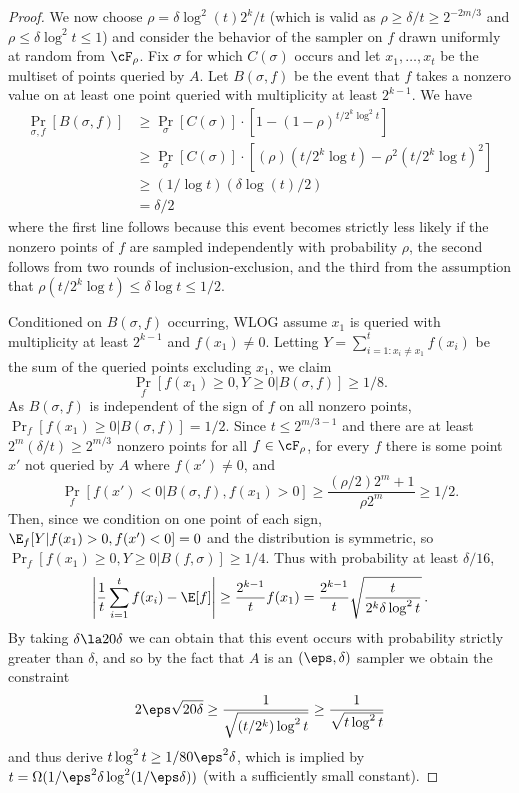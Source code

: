 \documentclass[11pt]{article}
\begin{document}
\begin{proof}
We now choose $\rho=\delta\log^2(t)2^k/t$ (which is valid as $\rho\geq \delta/t\geq 2^{-2m/3}$ and $\rho\leq \delta\log^2 t\leq 1$) and consider the behavior of the sampler on $f$ drawn uniformly at random from $\cF_\rho$. Fix $\sigma$ for which $C(\sigma)$ occurs and let $x_1,\ldots,x_t$ be the multiset of points queried by $A$. Let $B(\sigma,f)$ be the event that $f$ takes a nonzero value on at least one point queried with multiplicity at least $2^{k-1}$. We have
\begin{align*}
    \Pr_{\sigma,f}[B(\sigma,f)] &\geq \Pr_\sigma[C(\sigma)]\cdot \left[1-(1-\rho)^{t/2^k\log^2 t}\right]\\
    &\geq \Pr_\sigma[C(\sigma)]\cdot\left[(\rho)(t/2^k\log t)-\rho^2(t/2^k\log t)^2\right]\\
    &\geq (1/\log t)(\delta \log(t)/2)\\
    &= \delta/2%
\end{align*}
%
where %
the first line follows because this event becomes strictly less likely if the nonzero points of $f$ are sampled independently with probability $\rho$, the second follows from two rounds of inclusion-exclusion, and the third from the assumption that $\rho(t/2^k\log t)\leq \delta\log t\leq 1/2$. 

Conditioned on $B(\sigma,f)$ occurring, WLOG assume $x_1$ is queried with multiplicity at least $2^{k-1}$ and $f(x_1)\neq 0$. 
Letting $Y=\sum_{i=1:x_i\neq x_1}^tf(x_i)$ be the sum of the queried points excluding $x_1$, we claim
\[\Pr_{f}[f(x_1)\geq 0,Y\geq 0|B(\sigma,f)]\geq 1/8.\]
As $B(\sigma,f)$ is independent of the sign of $f$ on all nonzero points, $\Pr_f[f(x_1)\geq 0|B(\sigma,f)]=1/2$. Since $t \leq 2^{m/3-1}$ and there are at least $2^m(\delta/t)\geq 2^{m/3}$ nonzero points for all $f\in \cF_\rho$, for every $f$ there is some point $x'$ not queried by $A$ where $f(x')\neq 0$, and
\[\Pr_f[f(x')<0|B(\sigma,f),f(x_1)>0]\geq \frac{(\rho/2)2^m+1}{\rho 2^m}\geq 1/2.\]
Then, %
since we condition on one point of each sign, $\E_{f}[Y|f(x_1)>0,f(x')<0]=0$ and the distribution is symmetric, so $\Pr_{f}[f(x_1)\geq 0,Y\geq 0|B(f,\sigma)]\geq 1/4$. Thus with probability at least $\delta/16$,
\[\left|\frac{1}{t}\sum_{i=1}^tf(x_i)-\E[f]\right|\geq \frac{2^{k-1}}{t}f(x_1)=  \frac{2^{k-1}}{t}\sqrt{\frac{t}{2^k\delta\log^2t}}\,. \]  %
By taking $\delta\la 20\delta$ we can obtain that this event occurs with probability strictly greater than $\delta$, and so by the fact that $A$ is an $(\eps,\delta)$ sampler we obtain the constraint
\[2\eps\sqrt{20\delta} \geq \frac{1}{\sqrt{(t/2^k)\log^2t}} \geq \frac{1}{\sqrt{t\log^2 t}}\]
and thus derive $t\log^2 t\geq 1/80\eps^2\delta$, which is implied by $t=\Omega(1/\eps^2\delta\log^2(1/\eps\delta))$ (with a sufficiently small constant).
\end{proof}
\end{document}

